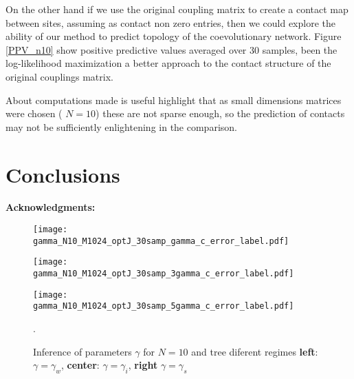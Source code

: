 \documentclass[reprint,amsmath,amssymb,superscriptaddress,showpacs,pre]{revtex4-1}
\begin{document}
On the other hand if we use the original coupling matrix to create a  contact map between sites, assuming as contact non zero entries, then we could explore the ability of our method to predict topology of the coevolutionary network.  Figure \ref{PPV_n10} show positive predictive values averaged over 30 samples, been the   log-likelihood maximization  a better approach to the contact structure of the original couplings matrix.


 About computations made is useful highlight that as  small dimensions matrices were chosen ( $N=10$) these are not sparse enough, so the prediction of contacts may not be sufficiently enlightening in the comparison. 

\section{Conclusions }
\label{conc}

\textbf{Acknowledgments:} 



\begin{figure*}[!htb]
	\begin{minipage}[b]{0.325\textwidth}
		\begin{center}
			\texttt{[image: gamma\_N10\_M1024\_optJ\_30samp\_gamma\_c\_error\_label.pdf]}
		\end{center}
	\end{minipage}
	\begin{minipage}[b]{0.325\textwidth}
		\begin{center}
			\texttt{[image: gamma\_N10\_M1024\_optJ\_30samp\_3gamma\_c\_error\_label.pdf]}
		\end{center}
	\end{minipage}
	\begin{minipage}[b]{0.325\textwidth}
		\begin{center}
			\texttt{[image: gamma\_N10\_M1024\_optJ\_30samp\_5gamma\_c\_error\_label.pdf]}
		\end{center}
	\end{minipage}
	
	\vspace{-1mm}
	\caption{{ Inference of parameters $\gamma$ for $N=10$ and tree diferent regimes \textbf{left}: $\gamma=\gamma_w$, \textbf{center}: $\gamma=\gamma_i$, \textbf{right} $\gamma=\gamma_s$  }} .
	\label{results_gamma10_n10}
\end{figure*}
\end{document}
